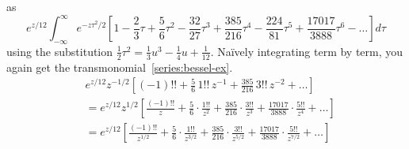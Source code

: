 \documentclass{article}
\theoremstyle{definition}
\begin{document}
as
\[ e^{z/12} \int_{-\infty}^\infty e^{-z\tau^2/2} \left[ 1 - \frac{2}{3} \tau + \frac{5}{6} \tau^2 - \frac{32}{27} \tau^3 + \frac{385}{216} \tau^4 - \frac{224}{81} \tau^5 + \frac{17017}{3888} \tau^6 - \ldots \right] d\tau \]
using the substitution $\tfrac{1}{2} \tau^2 = \tfrac{1}{3} u^3 - \tfrac{1}{4} u + \tfrac{1}{12}$. Na\"{i}vely integrating term by term, you again get the transmonomial~\eqref{series:bessel-ex}.
\color{DodgerBlue}
\begin{align*}
& e^{z/12} z^{-1/2} \left[ (-1)!! + \frac{5}{6}\,1!!\,z^{-1} + \frac{385}{216}\,3!!\,z^{-2} + \ldots \right] \\
& = e^{z/12} z^{1/2} \left[ \frac{(-1)!!}{z} + \frac{5}{6} \cdot \frac{1!!}{z^2} + \frac{385}{216} \cdot \frac{3!!}{z^3} + \frac{17017}{3888} \cdot \frac{5!!}{z^4} + \ldots \right] \\
& = e^{z/12} \left[ \frac{(-1)!!}{z^{1/2}} + \frac{5}{6} \cdot \frac{1!!}{z^{3/2}} + \frac{385}{216} \cdot \frac{3!!}{z^{5/2}} + \frac{17017}{3888} \cdot \frac{5!!}{z^{7/2}} + \ldots \right]
\end{align*}
\color{black}
\end{document}
